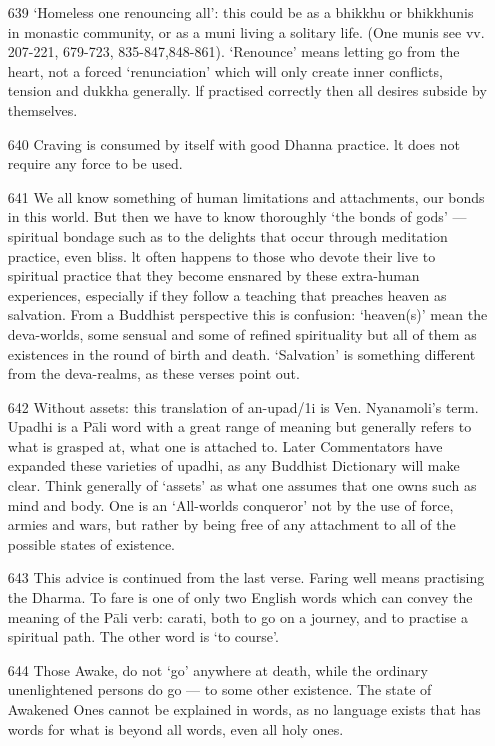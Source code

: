 \begin{itemize}
\item[639] `Homeless one renouncing all': this could be as a bhikkhu or bhikkhunis in monastic community, or as a muni living a solitary life. (One munis see vv. 207-221, 679-723, 835-847,848-861). `Renounce' means letting go from the heart, not a forced `renunciation' which will only create inner conflicts, tension and dukkha generally. lf practised correctly then all desires subside by themselves.

\item[640] Craving is consumed by itself with good Dhanna practice. lt does not require any force to be used.

\item[641] We all know something of human limitations and attachments, our bonds in this world. But then we have to know thoroughly `the bonds of gods' — spiritual bondage such as to the delights that occur through meditation practice, even bliss. lt often happens to those who devote their live to spiritual practice that they become ensnared by these extra-human experiences, especially if they follow a teaching that preaches heaven as salvation. From a Buddhist perspective this is confusion: `heaven(s)' mean the deva-worlds, some sensual and some of refined spirituality but all of them as existences in the round of birth and death. `Salvation' is something different from the deva-realms, as these verses point out.

\item[642] Without assets: this translation of an-upad/1i is Ven. Nyanamoli's term. Upadhi is a P\=ali word with a great range of meaning but generally refers to what is grasped at, what one is attached to. Later Commentators have expanded these varieties of upadhi, as any Buddhist Dictionary will make clear. Think generally of `assets' as what one assumes that one owns such as mind and body. One is an `All-worlds conqueror' not by the use of force, armies and wars, but rather by being free of any attachment to all of the possible states of existence.

\item[643] This advice is continued from the last verse. Faring well means practising the Dharma. To fare is one of only two English words which can convey the meaning of the P\=ali verb: carati, both to go on a journey, and to practise a spiritual path. The other word is `to course'.

\item[644] Those Awake, do not `go' anywhere at death, while the ordinary unenlightened persons do go — to some other existence. The state of Awakened Ones cannot be explained in words, as no language exists that has words for what is beyond all words, even all holy ones.


\end{itemize}
